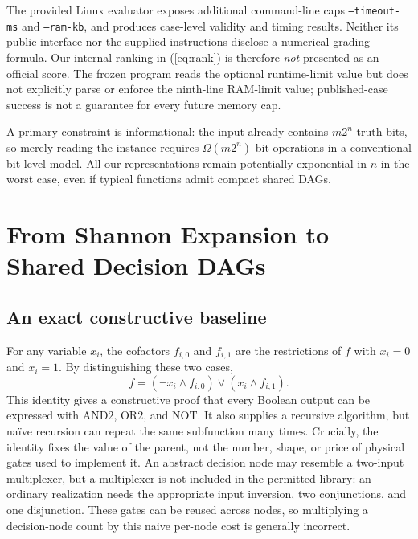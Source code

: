 \documentclass[journal,10pt]{IEEEtran}
\newcommand{\AND}{\mathrm{AND2}}
\newcommand{\OR}{\mathrm{OR2}}
\newcommand{\NOT}{\mathrm{NOT}}
\begin{document}
The provided Linux evaluator exposes additional command-line caps \texttt{--timeout-ms} and \texttt{--ram-kb}, and produces case-level validity and timing results. Neither its public interface nor the supplied instructions disclose a numerical grading formula. Our internal ranking in (\ref{eq:rank}) is therefore \emph{not} presented as an official score. The frozen program reads the optional runtime-limit value but does not explicitly parse or enforce the ninth-line RAM-limit value; published-case success is not a guarantee for every future memory cap.

A primary constraint is informational: the input already contains $m2^n$ truth bits, so merely reading the instance requires $\Omega(m2^n)$ bit operations in a conventional bit-level model. All our representations remain potentially exponential in $n$ in the worst case, even if typical functions admit compact shared DAGs.

\section{From Shannon Expansion to Shared Decision DAGs}
\subsection{An exact constructive baseline}
For any variable $x_i$, the cofactors $f_{i,0}$ and $f_{i,1}$ are the restrictions of $f$ with $x_i=0$ and $x_i=1$. By distinguishing these two cases,
\begin{equation}\label{eq:shannon}
 f=(\neg x_i\land f_{i,0})\lor(x_i\land f_{i,1}).
\end{equation}
This identity gives a constructive proof that every Boolean output can be expressed with $\AND$, $\OR$, and $\NOT$. It also supplies a recursive algorithm, but naïve recursion can repeat the same subfunction many times. Crucially, the identity fixes the value of the parent, not the number, shape, or price of physical gates used to implement it. An abstract decision node may resemble a two-input multiplexer, but a multiplexer is not included in the permitted library: an ordinary realization needs the appropriate input inversion, two conjunctions, and one disjunction. These gates can be reused across nodes, so multiplying a decision-node count by this naive per-node cost is generally incorrect.
\end{document}
